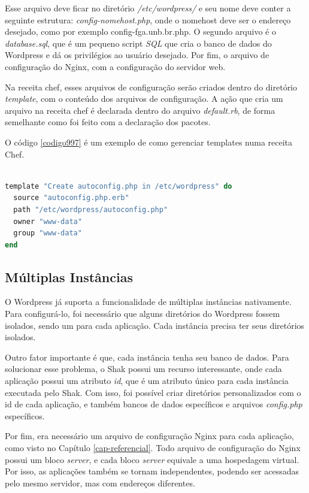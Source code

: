 Esse arquivo deve ficar no diretório \textit{/etc/wordpress/} e seu nome deve conter
a seguinte estrutura: \textit{config-nomehost.php}, onde o nomehost deve ser o endereço
desejado, como por exemplo config-fga.unb.br.php. O segundo arquivo é o \textit{database.sql}, que é um pequeno script \textit{SQL} que
cria o banco de dados do Wordpress e dá os privilégios ao usuário desejado. Por fim,
o arquivo de configuração do Nginx, com a configuração do servidor web.

Na receita chef, esses arquivos de configuração serão criados dentro do diretório 
\textit{template}, com o conteúdo dos arquivos de configuração. A ação que cria 
um arquivo na receita chef é 
declarada dentro do arquivo \textit{default.rb}, de forma semelhante como foi feito com
a declaração dos pacotes. 

O código \ref{codigo997} é um exemplo de como gerenciar templates numa receita Chef.

\begin{lstlisting}[basicstyle=\ttfamily, language=Ruby,label=dice_index,caption={Exemplo de criação de templates com o chef}, label=codigo997]

template "Create autoconfig.php in /etc/wordpress" do
  source "autoconfig.php.erb"
  path "/etc/wordpress/autoconfig.php"
  owner "www-data"
  group "www-data"
end
\end{lstlisting}

\subsection{Múltiplas Instâncias}

O Wordpress já suporta a funcionalidade de múltiplas instâncias nativamente. 
Para configurá-lo, foi necessário que alguns diretórios do Wordpress
fossem isolados, sendo um para cada aplicação. Cada instância precisa
ter seus diretórios isolados.

Outro fator importante é que, cada instância
tenha seu banco de dados. Para
solucionar esse problema, o Shak possui um recurso interessante, onde cada aplicação
possui um atributo \textit{id}, que é um atributo único para cada instância executada pelo
Shak. Com isso, foi possível criar diretórios personalizados com o id de cada aplicação, 
e também bancos de dados específicos e arquivos \textit{config.php} específicos.

Por fim, era necessário um arquivo de configuração Nginx para cada aplicação,
como visto no Capítulo \ref{cap-referencial}. Todo arquivo de configuração
do Nginx possui um bloco \textit{server}, e cada bloco \textit{server} equivale a uma hospedagem virtual. 
Por isso, as aplicações também se tornam independentes, podendo ser acessadas pelo 
mesmo servidor, mas com endereços diferentes. 

